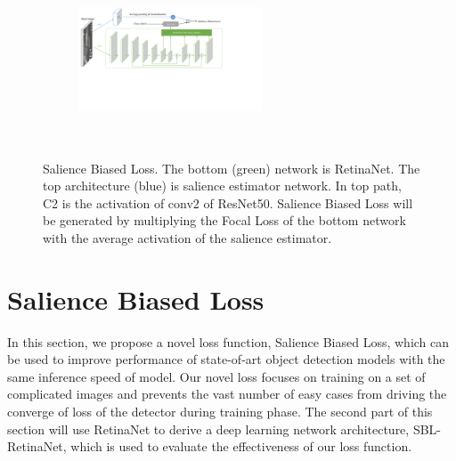 \documentclass[conference]{IEEEtran}
\begin{document}
	
        \begin{figure}[h]
    \center
    \begin{subfigure}[b]{\linewidth}
    	\centerline{\includegraphics[trim=0 200 200 0, clip, width=0.6\textwidth,height=5cm]{figure.pdf}}
   	\end{subfigure}	
   	\caption{Salience Biased Loss. The bottom (green) network is RetinaNet. The top architecture (blue) is salience estimator network. In top path, C2 is the activation of conv2 of ResNet50. Salience Biased Loss will be generated by multiplying the Focal Loss of the bottom network with the average activation of the salience estimator.}
   	\end{figure}	
\section{Salience Biased Loss}
    In this section, we propose a novel loss function, Salience Biased Loss, which can be used to improve performance of state-of-art object detection models with the same inference speed of model. Our novel loss focuses on training on a set of complicated images and prevents the vast number of easy cases from driving the converge of loss of the detector during training phase. The second part of this section will use RetinaNet to derive a deep learning network architecture, SBL-RetinaNet, which is used to evaluate the effectiveness of our loss function. 

	
\end{document}
